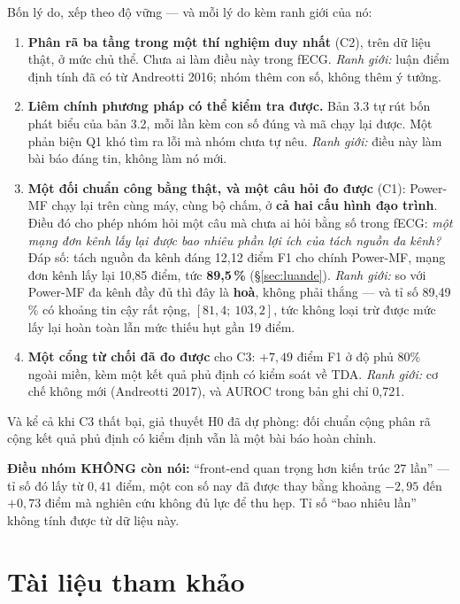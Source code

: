 \begin{ghichu}[title={Vì sao đề tài có cửa Q1}]
Bốn lý do, xếp theo độ vững --- và mỗi lý do kèm ranh giới của nó:
\begin{enumerate}[leftmargin=1.5em,itemsep=3pt]
\item \textbf{Phân rã ba tầng trong một thí nghiệm duy nhất} (C2), trên dữ liệu thật, ở mức chủ thể.
Chưa ai làm điều này trong fECG. \textit{Ranh giới:} luận điểm định tính đã có từ Andreotti 2016; nhóm
thêm con số, không thêm ý tưởng.
\item \textbf{Liêm chính phương pháp có thể kiểm tra được.} Bản 3.3 tự rút bốn phát biểu của bản 3.2,
mỗi lần kèm con số đúng và mã chạy lại được. Một phản biện Q1 khó tìm ra lỗi mà nhóm chưa tự nêu.
\textit{Ranh giới:} điều này làm bài báo đáng tin, không làm nó mới.
\item \textbf{Một đối chuẩn công bằng thật, và một câu hỏi đo được} (C1): Power-MF chạy lại trên cùng
máy, cùng bộ chấm, ở \textbf{cả hai cấu hình đạo trình}. Điều đó cho phép nhóm hỏi một câu mà chưa ai
hỏi bằng số trong fECG: \textit{một mạng đơn kênh lấy lại được bao nhiêu phần lợi ích của tách nguồn đa
kênh?} Đáp số: tách nguồn đa kênh đáng 12,12 điểm F1 cho chính Power-MF, mạng đơn kênh lấy lại 10,85
điểm, tức \textbf{89,5\,\%} (\S\ref{sec:luande}). \textit{Ranh giới:} so với Power-MF đa kênh đầy đủ thì
đây là \textbf{hoà}, không phải thắng --- và tỉ số 89,49\,\% có khoảng tin cậy rất rộng,
$[81{,}4;\ 103{,}2]$, tức không loại trừ được mức lấy lại hoàn toàn lẫn mức thiếu hụt gần 19 điểm.
\item \textbf{Một cổng từ chối đã đo được} cho C3: $+7{,}49$ điểm F1 ở độ phủ 80\% ngoài miền, kèm một
kết quả phủ định có kiểm soát về TDA. \textit{Ranh giới:} cơ chế không mới (Andreotti 2017), và AUROC
trong bản ghi chỉ 0,721.
\end{enumerate}
Và kể cả khi C3 thất bại, giả thuyết H0 đã dự phòng: đối chuẩn cộng phân rã cộng kết quả phủ định có
kiểm định vẫn là một bài báo hoàn chỉnh.

\textbf{Điều nhóm KHÔNG còn nói:} ``front-end quan trọng hơn kiến trúc 27 lần'' --- tỉ số đó lấy từ
$0{,}41$ điểm, một con số nay đã được thay bằng khoảng $-2{,}95$ đến $+0{,}73$ điểm mà nghiên cứu không
đủ lực để thu hẹp. Tỉ số ``bao nhiêu lần'' không tính được từ dữ liệu này.
\end{ghichu}

\clearpage

\section{Tài liệu tham khảo}

